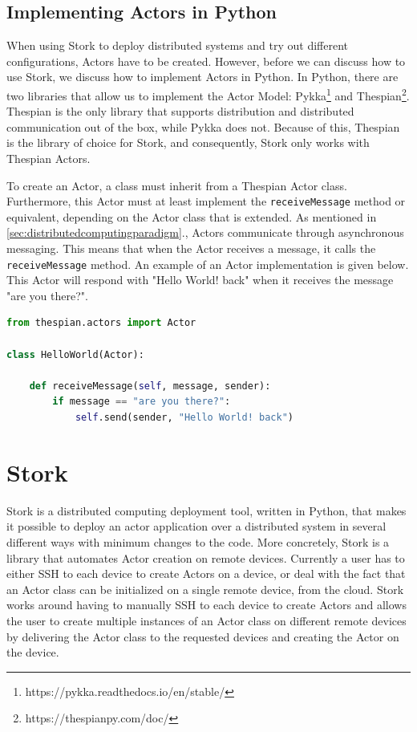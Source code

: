 \documentclass[a4paper]{article}
\newcommand{\secref}[1]{\autoref{#1}.}
\begin{document}
\subsection{Implementing Actors in Python}
\label{sec:implementingactors}
When using Stork to deploy distributed systems and try out different configurations, Actors have to be created. However, before we can discuss how to use Stork, we discuss how to implement Actors in Python. In Python, there are two libraries that allow us to implement the Actor Model: Pykka\footnote{https://pykka.readthedocs.io/en/stable/} and Thespian\footnote{https://thespianpy.com/doc/}. Thespian is the only library that supports distribution and distributed communication out of the box, while Pykka does not. Because of this, Thespian is the library of choice for Stork, and consequently, Stork only works with Thespian Actors.

To create an Actor, a class must inherit from a Thespian Actor class. Furthermore, this Actor must at least implement the \lstinline{receiveMessage} method or equivalent, depending on the Actor class that is extended. As mentioned in \secref{sec:distributedcomputingparadigm}, Actors communicate through asynchronous messaging. This means that when the Actor receives a message, it calls the \lstinline{receiveMessage} method. An example of an Actor implementation is given below. This Actor will respond with "Hello World! back" when it receives the message "are you there?".
\begin{lstlisting}[language=Python, caption=Actor example, label=lst:actor]
from thespian.actors import Actor

class HelloWorld(Actor):

    def receiveMessage(self, message, sender):
        if message == "are you there?":
            self.send(sender, "Hello World! back")
\end{lstlisting}
\section{Stork}
Stork is a distributed computing deployment tool, written in Python, that makes it possible to deploy an actor application over a distributed system in several different ways with minimum changes to the code. More concretely, Stork is a library that automates Actor creation on remote devices. Currently a user has to either SSH to each device to create Actors on a device, or deal with the fact that an Actor class can be initialized on a single remote device, from the cloud. Stork works around having to manually SSH to each device to create Actors and allows the user to create multiple instances of an Actor class on different remote devices by delivering the Actor class to the requested devices and creating the Actor on the device.
\end{document}
